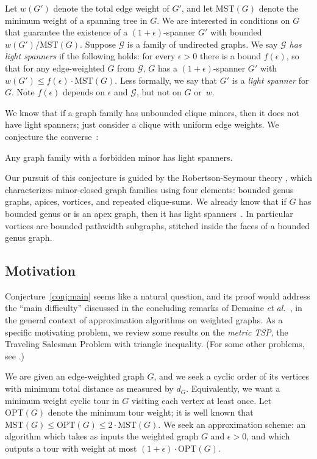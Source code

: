 \documentclass{llncs}
\def\MST{\mbox{MST}}\def\OPT{\mbox{OPT}}\def\Left{\mbox{left}}\def\In#1{\mbox{in$(#1)$}} \def\Out#1{\mbox{out$(#1)$}} \def\Net#1{\mbox{net$(#1)$}} \def\xeP{x_{(e,P)}}
\begin{document}
Let $w(G')$ denote the total edge weight of $G'$, and let $\MST(G)$
denote the minimum weight of a spanning tree in $G$.  We are
interested in conditions on $G$ that guarantee the existence of a
$(1+\epsilon)$-spanner $G'$ with bounded $w(G')/\MST(G)$.
Suppose $\mathcal{G}$ is a family of undirected graphs.  We
say \emph{$\mathcal{G}$ has light spanners} if the following
holds: for every $\epsilon>0$ there is a bound $f(\epsilon)$, so that
for any edge-weighted $G$ from $\mathcal{G}$, $G$ has a
$(1+\epsilon)$-spanner $G'$ with $w(G') \leq f(\epsilon)\cdot\MST(G)$.
Less formally, we say that $G'$ is a \emph{light spanner} for $G$.
Note $f(\epsilon)$ depends on $\epsilon$ and $\mathcal{G}$, but not on
$G$ or~$w$.

We know that if a graph family has unbounded clique minors, then it
does not have light spanners; just consider a clique with uniform edge
weights.  We conjecture the
converse~\cite{Grigni:2000:ATG:646253.686316}:
\begin{conjecture}\label{conj:main}
Any graph family with a forbidden minor has light spanners.
\end{conjecture}

Our pursuit of this conjecture is guided by the Robertson-Seymour
theory \cite{DBLP:journals/jct/RobertsonS03a}, which characterizes 
minor-closed graph families using four elements: bounded genus graphs,
apices, vortices, and repeated clique-sums.  We already know that if
$G$ has bounded genus or is an apex graph, then it has light
spanners~\cite
{Grigni:2000:ATG:646253.686316,Grigni:2002:LSA:545381.545492}.
In particular vortices are bounded pathwidth subgraphs, stitched inside
the faces of a bounded genus graph.


\subsection{Motivation}

Conjecture~\ref{conj:main} seems like a natural question, and its
proof would address the ``main difficulty'' discussed in the
concluding remarks of Demaine \emph{et
al.}~\cite{Demaine:2007:AAV:1283383.1283413}, in the general context
of approximation algorithms on weighted graphs.  As a specific
motivating problem, we review some results on the \emph{metric TSP},
the Traveling Salesman Problem with triangle inequality.  (For some
other problems, see
\cite{Berger05approximationschemes,DBLP:conf/icalp/BergerG07}.)

 We are given an edge-weighted graph $G$, and we seek a cyclic
order of its vertices with minimum total distance as measured by
$d_G$.  Equivalently, we want a minimum weight cyclic tour in $G$
visiting each vertex at least once.  Let $\OPT(G)$ denote the minimum
tour weight; it is well known that $\MST(G) \leq \OPT(G) \leq
2\cdot\MST(G)$.  We seek an approximation scheme: an algorithm which
takes as inputs the weighted graph $G$ and $\epsilon>0$, and which
outputs a tour with weight at most $(1+\epsilon)\cdot\OPT(G)$.
\end{document}
